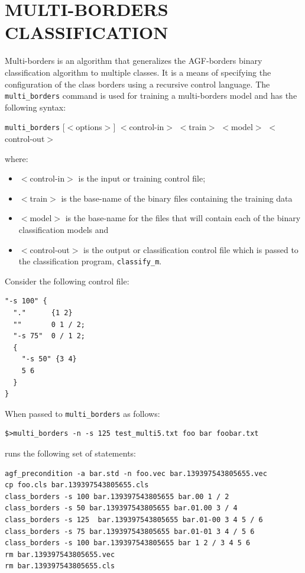\documentclass[12pt]{article}
\begin{document}
\section{MULTI-BORDERS CLASSIFICATION}

\label{MULTI_BORDERS_CLASSIFICATION}

  Multi-borders is an algorithm that generalizes the AGF-borders binary classification algorithm to multiple classes.  It is a means of specifying the configuration of the class borders using a recursive control language.  The \verb/multi_borders/ command is used for training a multi-borders model and has the following syntax:

  \verb/multi_borders/ [$<$options$>$] $<$control-in$>$ $<$train$>$ $<$model$>$ $<$control-out$>$

where:
\begin{itemize}
\item $<$control-in$>$ is the input or training control file; 
\item $<$train$>$ is the base-name of the binary files containing the training data
\item $<$model$>$ is the base-name for the files that will contain each of the binary classification models and 
\item $<$control-out$>$ is the output or classification control file which is passed to the classification program, \verb/classify_m/.
\end{itemize}

Consider the following control file:

\begin{verbatim}
"-s 100" {
  "."      {1 2}
  ""       0 1 / 2;
  "-s 75"  0 / 1 2;
  {
    "-s 50" {3 4}
    5 6
  } 
}
\end{verbatim}

When passed to \verb/multi_borders/ as follows:

\begin{verbatim}
$>multi_borders -n -s 125 test_multi5.txt foo bar foobar.txt
\end{verbatim}

runs the following set of statements:

\begin{verbatim}
agf_precondition -a bar.std -n foo.vec bar.139397543805655.vec
cp foo.cls bar.139397543805655.cls
class_borders -s 100 bar.139397543805655 bar.00 1 / 2
class_borders -s 50 bar.139397543805655 bar.01.00 3 / 4
class_borders -s 125  bar.139397543805655 bar.01-00 3 4 5 / 6
class_borders -s 75 bar.139397543805655 bar.01-01 3 4 / 5 6
class_borders -s 100 bar.139397543805655 bar 1 2 / 3 4 5 6
rm bar.139397543805655.vec
rm bar.139397543805655.cls
\end{verbatim}
\end{document}
